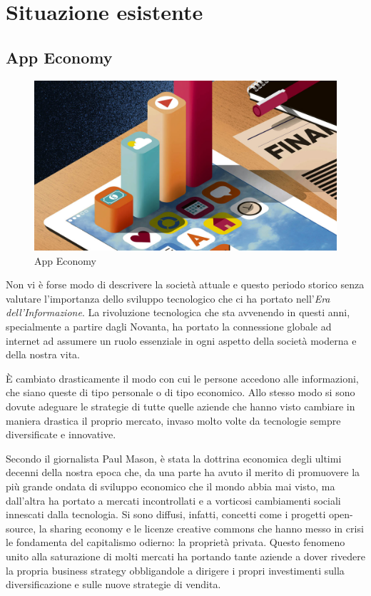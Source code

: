 \section{Situazione esistente}

\subsection{App Economy}
  
\begin{figure}[h!]
  \includegraphics[width=\linewidth]{images/The-App-Economy.jpg}
  \caption{App Economy}
  \label{fig:appEconomy1}
\end{figure}
  
Non vi è forse modo di descrivere la società attuale e questo periodo storico senza valutare l'importanza dello sviluppo tecnologico che ci ha portato nell'\textit{Era dell'Informazione}.
La rivoluzione tecnologica che sta avvenendo in questi anni, specialmente a partire dagli Novanta, ha portato la connessione globale ad internet ad assumere un ruolo essenziale in ogni aspetto della società moderna e della nostra vita.

È cambiato drasticamente il modo con cui le persone accedono alle informazioni, che siano queste di tipo personale o di tipo economico.
Allo stesso modo si sono dovute adeguare le strategie di tutte quelle aziende che hanno visto cambiare in maniera drastica il proprio mercato, invaso molto volte da tecnologie sempre diversificate e innovative.

Secondo il giornalista Paul Mason, è stata la dottrina economica degli ultimi decenni della nostra epoca che, da una parte ha avuto il merito di promuovere la più grande ondata di sviluppo economico che il mondo abbia mai visto, ma dall’altra ha portato a mercati incontrollati e a vorticosi cambiamenti sociali innescati dalla tecnologia.
Si sono diffusi, infatti, concetti come i progetti open-source, la sharing economy e le licenze creative commons che hanno messo in crisi le fondamenta del capitalismo odierno: la proprietà privata. 
Questo fenomeno unito alla saturazione di molti mercati ha portando tante aziende a dover rivedere la propria business strategy obbligandole a dirigere i propri investimenti sulla diversificazione e sulle nuove strategie di vendita. \autocite{POSTCAPITALISMO}

